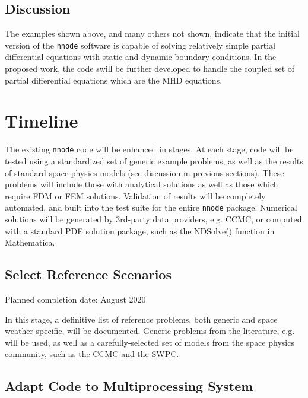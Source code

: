 \documentclass{article}
\begin{document}
\subsection{Discussion}

The examples shown above, and many others not shown, indicate that the initial version of the \texttt{nnode} software is capable of solving relatively simple partial differential equations with static and dynamic boundary conditions. In the proposed work, the code swill be further developed to handle the coupled set of partial differential equations which are the MHD equations.


\newpage

\section{Timeline}

The existing \texttt{nnode} code will be enhanced in stages. At each stage, code will be tested using a standardized set of generic example problems, as well as the results of standard space physics models (see discussion in previous sections). These problems will include those with analytical solutions as well as those which require FDM or FEM solutions. Validation of results will be completely automated, and built into the test suite for the entire \texttt{nnode} package. Numerical solutions will be generated by 3rd-party data providers, e.g. CCMC, or computed with a standard PDE solution package, such as the NDSolve() function in Mathematica.

\subsection{Select Reference Scenarios}

Planned completion date: August 2020

In this stage, a definitive list of reference problems, both generic and space weather-specific, will be documented. Generic problems from the literature, e.g. \cite{Lagaris1998} will be used, as well as a carefully-selected set of models from the space physics community, such as the CCMC and the SWPC.

\subsection{Adapt Code to Multiprocessing System}
\end{document}
